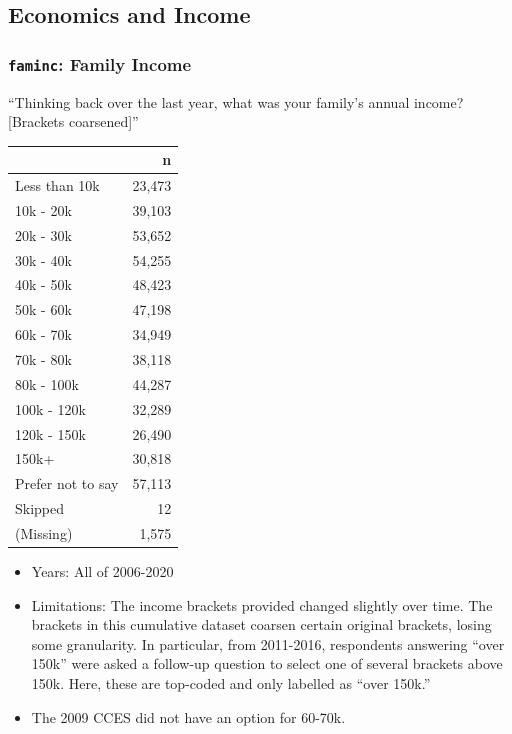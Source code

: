 \documentclass[10pt,article,oneside]{memoir}
\theoremstyle{definition}
\begin{document}
\hypertarget{economics-and-income}{%
\subsection{Economics and Income}\label{economics-and-income}}

\hypertarget{faminc-family-income}{%
\subsubsection{\texorpdfstring{\texttt{faminc}: Family
Income}{faminc: Family Income}}\label{faminc-family-income}}

``Thinking back over the last year, what was your family's annual
income? {[}Brackets coarsened{]}''

\begin{table}[H]
\centering
\begin{tabular}[t]{lr}
\toprule
 & n\\
\midrule
Less than 10k & 23,473\\
10k - 20k & 39,103\\
20k - 30k & 53,652\\
30k - 40k & 54,255\\
40k - 50k & 48,423\\
50k - 60k & 47,198\\
60k - 70k & 34,949\\
70k - 80k & 38,118\\
80k - 100k & 44,287\\
100k - 120k & 32,289\\
120k - 150k & 26,490\\
150k+ & 30,818\\
Prefer not to say & 57,113\\
Skipped & 12\\
(Missing) & 1,575\\
\bottomrule
\end{tabular}
\end{table}

\begin{itemize}
\tightlist
\item
  Years: All of 2006-2020
\item
  Limitations: The income brackets provided changed slightly over time.
  The brackets in this cumulative dataset coarsen certain original
  brackets, losing some granularity. In particular, from 2011-2016,
  respondents answering ``over 150k'' were asked a follow-up question to
  select one of several brackets above 150k. Here, these are top-coded
  and only labelled as ``over 150k.''
\item
  The 2009 CCES did not have an option for 60-70k.
\end{itemize}
\end{document}
